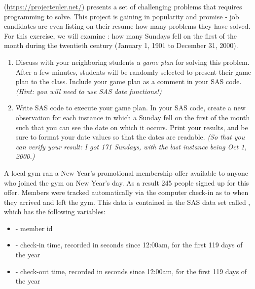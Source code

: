 





\vskip10pt
\vskip10pt

 (\url{https://projecteuler.net/}) presents a set of challenging problems that requires programming to solve.  This project is gaining in popularity and promise - job candidates are even listing on their resume how many  problems they have solved.  For this exercise, we  will examine : how many Sundays fell on the first of the month during the twentieth century (January 1, 1901 to December 31, 2000).
\begin{enumerate}
\item Discuss with your neighboring students a \emph{game plan} for solving this problem.  After a few minutes, students will be randomly selected to present their game plan to the class. Include your game plan as a comment in your SAS code.  \emph{(Hint: you will need to use SAS date functions!)}
\item  Write SAS code to execute your game plan.  In your SAS code, create a new observation for each instance in which a Sunday fell on the first of the month such that you can see the date on which it occurs.  Print your results, and be sure to format your date values so that the dates are readable.  \emph{(So that you can verify your result: I got 171 Sundays, with the last instance being Oct 1, 2000.)}
\end{enumerate}

A local gym ran a New Year's promotional membership offer available to anyone who joined the gym on New Year's day.  As a result 245 people signed up for this offer.  Members were tracked automatically via the computer check-in as to when they arrived and left the gym. This data is contained in the SAS data set called , which has the following variables:
	\begin{itemize}
		\item {} - member id
		\item {} - check-in time, recorded in seconds since 12:00am, for the first 119 days of the year
		\item {} - check-out time, recorded in seconds since 12:00am, for the first 119 days of the year
	\end{itemize}

